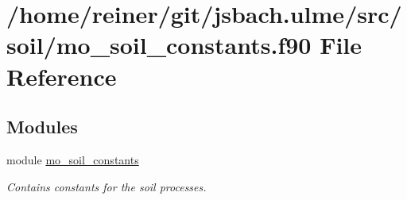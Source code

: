\hypertarget{mo__soil__constants_8f90}{}\section{/home/reiner/git/jsbach.ulme/src/soil/mo\+\_\+soil\+\_\+constants.f90 File Reference}
\label{mo__soil__constants_8f90}
\subsection*{Modules}
\begin{DoxyCompactItemize}
\item 
module \hyperlink{namespacemo__soil__constants}{mo\+\_\+soil\+\_\+constants}
\begin{DoxyCompactList}\small\item\em Contains constants for the soil processes. \end{DoxyCompactList}\end{DoxyCompactItemize}
